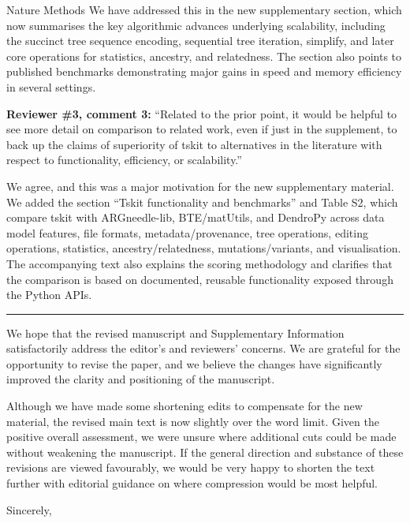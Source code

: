 \documentclass{letter}
\begin{document}
\begin{letter}{Nature Methods}
We have addressed this in the new supplementary section, which now
summarises the key algorithmic advances underlying
scalability, including the succinct tree sequence encoding, sequential tree
iteration, simplify, and later core operations for statistics, ancestry, and
relatedness. The section also points to published benchmarks demonstrating
major gains in speed and memory efficiency in several settings.

\noindent \textbf{Reviewer \#3, comment 3:} ``Related to the prior point, it
would be helpful to see more detail on comparison to related work, even if just
in the supplement, to back up the claims of superiority of tskit to
alternatives in the literature with respect to functionality, efficiency, or
scalability.''

We agree, and this was a major motivation for the new supplementary material.
We added the section ``Tskit functionality and benchmarks'' and Table S2, which
compare tskit with ARGneedle-lib, BTE/matUtils, and DendroPy across data model
features, file formats, metadata/provenance, tree operations, editing
operations, statistics, ancestry/relatedness, mutations/variants, and
visualisation. The accompanying text also explains the scoring methodology and
clarifies that the comparison is based on documented, reusable functionality
exposed through the Python APIs.

\medskip
\hrule
\medskip

We hope that the revised manuscript and Supplementary Information
satisfactorily address the editor's and reviewers' concerns. We are grateful
for the opportunity to revise the paper, and we believe the changes have
significantly improved the clarity and positioning of the manuscript.

Although we have made some shortening edits to compensate for the
new material, the revised main text is now slightly over the word limit.
Given the positive overall assessment,
we were unsure where additional cuts could be made
without weakening the manuscript. If the general direction and substance of these
revisions are viewed favourably, we would be very happy to shorten the text
further with editorial guidance on where compression would be most helpful.


\closing{Sincerely,}

\end{letter}
\end{document}
